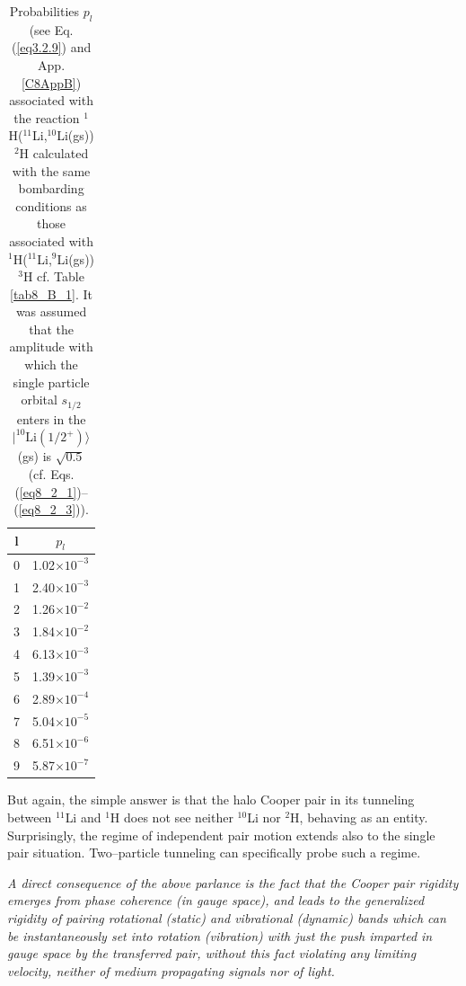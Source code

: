   \begin{table}
  \begin{tabular}{|c|c|}
  \hline  l & $p_l$ \\ 
\hline  0 & 1.02$\times 10^{-3}$ \\ 
\hline  1 & 2.40$\times 10^{-3}$ \\ 
\hline  2 &  1.26$\times 10^{-2}$ \\ 
\hline  3 &  1.84$\times 10^{-2}$ \\ 
\hline  4 &  6.13$\times 10^{-3}$\\ 
\hline  5 &  1.39$\times 10^{-3}$\\ 
\hline  6 &  2.89$\times 10^{-4}$\\ 
\hline  7 &  5.04$\times 10^{-5}$\\ 
\hline  8 &  6.51$\times 10^{-6}$\\ 
\hline  9 &  5.87$\times 10^{-7}$\\
\hline
  \end{tabular}\caption{Probabilities $p_l$ (see Eq. (\ref{eq3.2.9}) and App. \ref{C8AppB}) associated with the reaction $^1$H($^{11}$Li,$^{10}$Li(gs))$^2$H calculated with the same bombarding conditions as those associated with $^1$H($^{11}$Li,$^{9}$Li(gs))$^3$H cf. Table \ref{tab8_B_1}. It was assumed that the amplitude with which the single particle orbital $s_{1/2}$ enters in the $|^{10}\text{Li}(1/2^+)\rangle$ (gs) is $\sqrt{0.5}$ (cf. Eqs. (\ref{eq8_2_1})--(\ref{eq8_2_3})).}\label{tab3.3.1}
  \end{table}
But again, the simple answer is that the halo Cooper pair in its tunneling between $^{11}$Li and $^1$H does not see neither $^{10}$Li nor $^2$H, behaving as an entity. Surprisingly, the regime of independent pair motion extends also to the single pair situation. Two--particle tunneling can specifically probe such a regime. 



\textit{A direct consequence of the above parlance is the fact that the Cooper pair rigidity emerges from phase coherence (in gauge space), and leads to the generalized rigidity of pairing rotational (static) and vibrational (dynamic) bands which can be instantaneously set into rotation (vibration) with just the push imparted in gauge space by the transferred pair, without this fact violating any limiting velocity, neither of medium propagating signals nor of light.}








